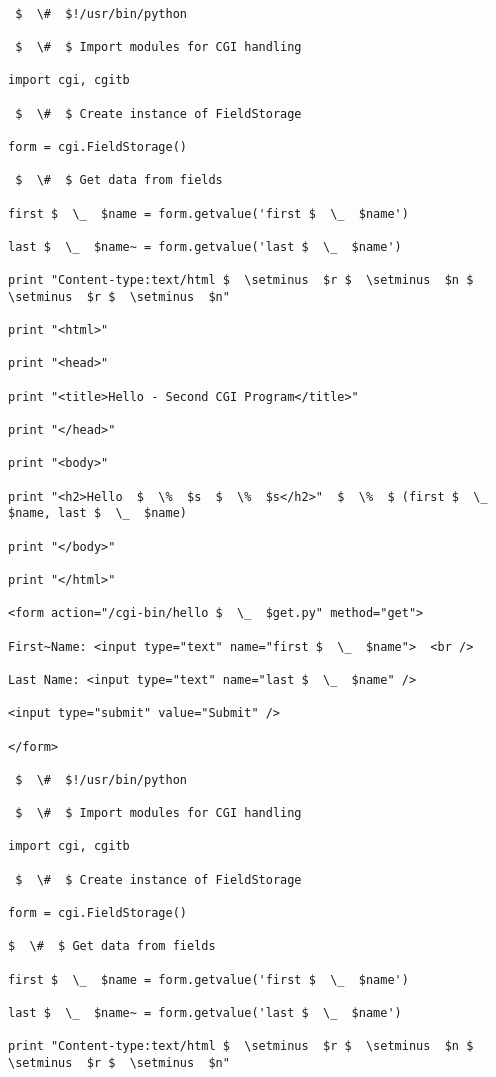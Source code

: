 \begin {enumerate}
\begin {enumerate}
\begin{verbatim}

 $  \#  $!/usr/bin/python

 $  \#  $ Import modules for CGI handling

import cgi, cgitb

 $  \#  $ Create instance of FieldStorage

form = cgi.FieldStorage()

 $  \#  $ Get data from fields

first $  \_  $name = form.getvalue('first $  \_  $name')

last $  \_  $name~ = form.getvalue('last $  \_  $name')

print "Content-type:text/html $  \setminus  $r $  \setminus  $n $  \setminus  $r $  \setminus  $n"

print "<html>"

print "<head>"

print "<title>Hello - Second CGI Program</title>"

print "</head>"

print "<body>"

print "<h2>Hello  $  \%  $s  $  \%  $s</h2>"  $  \%  $ (first $  \_  $name, last $  \_  $name)

print "</body>"

print "</html>"

<form action="/cgi-bin/hello $  \_  $get.py" method="get">

First~Name: <input type="text" name="first $  \_  $name">  <br />

Last Name: <input type="text" name="last $  \_  $name" />

<input type="submit" value="Submit" />

</form>

 $  \#  $!/usr/bin/python

 $  \#  $ Import modules for CGI handling

import cgi, cgitb

 $  \#  $ Create instance of FieldStorage

form = cgi.FieldStorage()

$  \#  $ Get data from fields

first $  \_  $name = form.getvalue('first $  \_  $name')

last $  \_  $name~ = form.getvalue('last $  \_  $name')

print "Content-type:text/html $  \setminus  $r $  \setminus  $n $  \setminus  $r $  \setminus  $n"


\end{verbatim}
\end{enumerate}
\end{enumerate}
